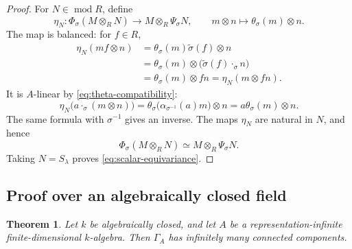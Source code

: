 \documentclass[11pt,letterpaper,reqno]{amsart}
\newtheorem{theorem}{Theorem}[section]
\theoremstyle{definition}
\newcommand{\modcat}{\operatorname{mod}}
\begin{document}
\begin{proof}
For $N\in\modcat R$, define
\[
\eta_N:\Phi_\sigma(M\otimes_RN)
 \longrightarrow M\otimes_R\Psi_\sigma N,
\qquad m\otimes n\longmapsto\theta_\sigma(m)\otimes n.
\]
The map is balanced: for $f\in R$,
\[
\begin{aligned}
\eta_N(mf\otimes n)
 &=\theta_\sigma(m)\widetilde\sigma(f)\otimes n\\
 &=\theta_\sigma(m)\otimes
   \bigl(\widetilde\sigma(f)\mathbin{\cdot_\sigma}n\bigr)\\
 &=\theta_\sigma(m)\otimes fn
 =\eta_N(m\otimes fn).
\end{aligned}
\]
It is $A$-linear by \eqref{eq:theta-compatibility}:
\[
\eta_N\bigl(a\mathbin{\cdot_\sigma}(m\otimes n)\bigr)
 =\theta_\sigma\bigl(\alpha_{\sigma^{-1}}(a)m\bigr)\otimes n
 =a\theta_\sigma(m)\otimes n.
\]
The same formula with $\sigma^{-1}$ gives an inverse.  The maps $\eta_N$
are natural in $N$, and hence
\[
\Phi_\sigma(M\otimes_RN)
 \simeq M\otimes_R\Psi_\sigma N.
\]
Taking $N=S_\lambda$ proves \eqref{eq:scalar-equivariance}.
\end{proof}

\subsection{Proof over an algebraically closed field}

\begin{theorem}\label{thm:algebraically-closed}
Let $k$ be algebraically closed, and let $A$ be a representation-infinite
finite-dimensional $k$-algebra.  Then $\Gamma_A$ has infinitely many
connected components.
\end{theorem}
\end{document}
